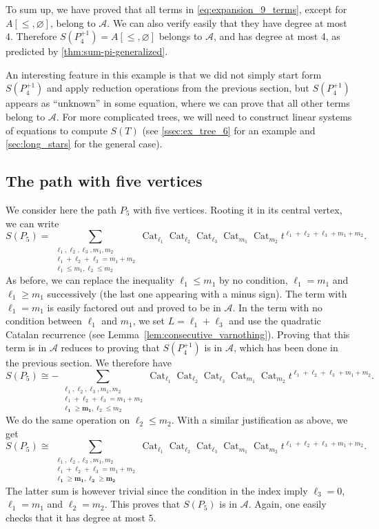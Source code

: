 \documentclass[12pt]{amsart}
\theoremstyle{plain}
\theoremstyle{remark}
\DeclareMathOperator{\Cat}{Cat}
\def\cA{\mathcal{A}}
\begin{document}
 To sum up, we have proved that all terms in \cref{eq:expansion_9_terms}, except for $A[\le,\varnothing]$,
 belong to $\cA$. We can also verify easily that they have degree at most $4$.
  Therefore $S(P_4^{+1})  = A[\le,\varnothing]$ belongs to $\cA$, and has
degree at most 4, as predicted by \cref{thm:sum-pi-generalized}.
\medskip

 An interesting feature in this example is that we did not simply start form $S(P_4^{+1})$ and apply
 reduction operations from the previous section, but $S(P_4^{+1})$ appears as \enquote{unknown} in some equation,
 where we can prove that all other terms belong to $\cA$.
 For more complicated trees, we will need to construct linear systems of equations to compute $S(T)$
 (see \cref{ssec:ex_tree_6} for an example and \cref{sec:long_stars} for the general case).


 \subsection{The path with five vertices}
 \label{ssec:ex_tree_P5}
 We consider here the path $P_5$ with five vertices. Rooting it in its central vertex,
 we can write
 \[S(P_5)=\sum_{\substack{\ell_1, \ell_2, \ell_3, m_1, m_2 \\  \ell_1 + \ell_2+\ell_3= m_1 + m_2 \\ \ell_1 \le m_1, \ell_2 \le m_2}} \Cat_{\ell_1} \Cat_{\ell_2}\Cat_{\ell_3}\Cat_{m_1}\Cat_{m_2}t^{\ell_1 + \ell_2+\ell_3+m_1 + m_2}.\]
 As before, we can replace the inequality $\ell_1 \le m_1$ by no condition, $\ell_1=m_1$ and $\ell_1 \ge m_1$ successively
 (the last one appearing with a minus sign).
 The term with $\ell_1=m_1$ is easily factored out and proved to be in $\cA$.
 In the term with no condition between $\ell_1$ and $m_1$, we set $L=\ell_1+\ell_3$ and
 use the quadratic Catalan recurrence (see Lemma~\ref{lem:consecutive_varnothing}).
 Proving that this term is in $\cA$ reduces to proving that $S(P_4^{+1})$ is in $\cA$,
 which has been done in the previous section. We therefore have
 \[ S(P_5) \cong - \sum_{\substack{\ell_1, \ell_2, \ell_3, m_1, m_2 \\  \ell_1 + \ell_2+\ell_3= m_1 + m_2 \\ \bm{ \ell_1 \ge m_1}, \ell_2 \le m_2}} \Cat_{\ell_1} \Cat_{\ell_2}\Cat_{\ell_3}\Cat_{m_1}\Cat_{m_2}t^{\ell_1 + \ell_2+\ell_3+m_1 + m_2}.\]
 We do the same operation on $\ell_2 \le m_2$. With a similar justification as above, we get
 \[ S(P_5) \cong \sum_{\substack{\ell_1, \ell_2, \ell_3, m_1, m_2 \\  \ell_1 + \ell_2+\ell_3= m_1 + m_2 \\ \bm{\ell_1 \ge m_1}, \bm{\ell_2 \ge m_2}}} \Cat_{\ell_1} \Cat_{\ell_2}\Cat_{\ell_3}\Cat_{m_1}\Cat_{m_2}t^{\ell_1 + \ell_2+\ell_3+m_1 + m_2}.\]
The latter sum is however trivial since the condition in the index
 imply $\ell_3=0$, $\ell_1=m_1$ and $\ell_2=m_2$.
This proves that $S(P_5)$ is in $\cA$. Again, one easily checks that it has degree at most $5$.
\end{document}
